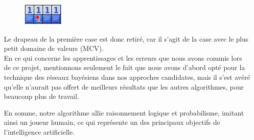 \documentclass{article}
\begin{document}
\begin{enumerate}
\begin{figure}[h!]
  \centering
  \includegraphics[scale=.5]{./demineur_6.png}
\end{figure}

Le drapeau de la première case est donc retiré, car il s’agit de la case avec le plus petit domaine de valeurs (MCV). \\

En ce qui concerne les apprentissages et les erreurs que nous avons commis lors de ce 
projet, mentionnons seulement le fait que nous avons d’abord opté pour la technique des 
réseaux bayésiens dans nos approches candidates, mais il s’est avéré qu’elle n’aurait pas
offert de meilleurs résultats que les autres algorithmes, pour beaucoup plus de travail. 

En somme, notre algorithme allie raisonnement logique et probabilisme, imitant ainsi un joueur 
humain, ce qui représente un des principaux objectifs de l'intelligence artificielle.

\end{enumerate}
\end{document}

